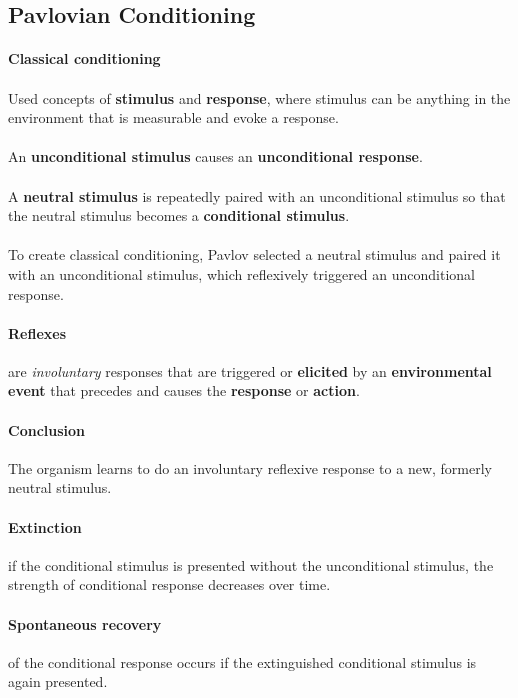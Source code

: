 \documentclass{article}
\begin{document}
	\subsection{Pavlovian Conditioning}
	\paragraph{Classical conditioning}
	\paragraph{} Used concepts of \textbf{stimulus} and \textbf{response}, where stimulus can be anything in the environment that is measurable and evoke a response.
	\paragraph{} An \textbf{unconditional stimulus} causes an \textbf{unconditional response}.
	\paragraph{} A \textbf{neutral stimulus} is repeatedly paired with an unconditional stimulus so that the neutral stimulus becomes a \textbf{conditional stimulus}.
	\paragraph{} To create classical conditioning, Pavlov selected a neutral stimulus and paired it with an unconditional stimulus, which reflexively triggered an unconditional response.
	\paragraph{Reflexes} are \emph{involuntary} responses that are triggered or \textbf{elicited} by an \textbf{environmental event} that precedes and causes the \textbf{response} or \textbf{action}.
	\paragraph{Conclusion} The organism learns to do an involuntary reflexive response to a new, formerly neutral stimulus.
	\paragraph{Extinction} if the conditional stimulus is presented without the unconditional stimulus, the strength of conditional response decreases over time.
	\paragraph{Spontaneous recovery} of the conditional response occurs if the extinguished conditional stimulus is again presented.
\end{document}

